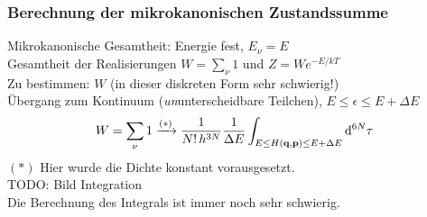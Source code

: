 \subsubsection{Berechnung der mikrokanonischen Zustandssumme}
Mikrokanonische Gesamtheit: Energie fest, $E_\nu = E$ \\
Gesamtheit der Realisierungen $W = \sum_{\nu} 1 $ und $Z = W e^{-E/kT}$ \\
Zu bestimmen: $W$ (in dieser diskreten Form sehr schwierig!) \\
Übergang zum Kontinuum (\emph{un}unterscheidbare Teilchen), $E \leq \epsilon \leq E + \Delta E$
\begin{equation}
    W = \sum_\nu 1 \xrightarrow{(*)} \frac{1}{N! \, h^{3N}} \frac{1}{\Delta E} \int_{E \leq H(\textbf{q}, \textbf{p}) \leq E + \Delta E} \mathrm{d}^{6N} \tau
\end{equation}
$(*)$ Hier wurde die Dichte konstant vorausgesetzt. \\
TODO: Bild Integration \\ %
Die Berechnung des Integrals ist immer noch sehr schwierig.
